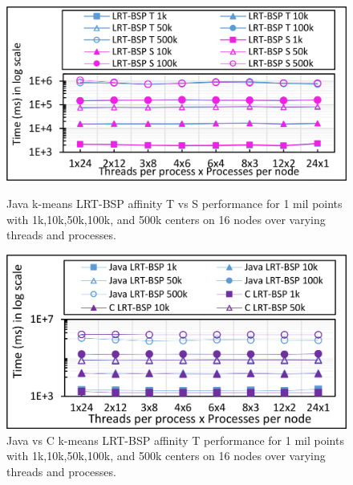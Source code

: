 \documentclass[10pt, conference, compsocconf]{IEEEtran}
\begin{document}
\begin{figure}[!htb]
    \begin{minipage}{0.49\textwidth}
        \centering
        \includegraphics[width=1\columnwidth]{images/fig_kmeans_1mil_varying_centers_BSP_T_vs_BSP_S_Java}
		\caption{Java k-means \ac{LRT-BSP} affinity T vs S performance for 1 mil points with 1k,10k,50k,100k, and 500k centers on 16 nodes over varying threads and processes.}
		\label{fig:images/fig_kmeans_1mil_varying_centers_BSP_T_C_vs_Java}
    \end{minipage}
    \hspace{1.4mm}
    \begin{minipage}{0.49\textwidth}
        \centering
        \includegraphics[width=1\columnwidth]{images/fig_kmeans_1mil_varying_centers_BSP_T_C_vs_Java}
		\caption{Java vs C k-means \ac{LRT-BSP} affinity T performance for 1 mil points with 1k,10k,50k,100k, and 500k centers on 16 nodes over varying threads and processes.}
		\label{fig:images/fig_kmeans_1mil_varying_centers_BSP_T_C_vs_Java}
    \end{minipage}   
\end{figure}
\end{document}
